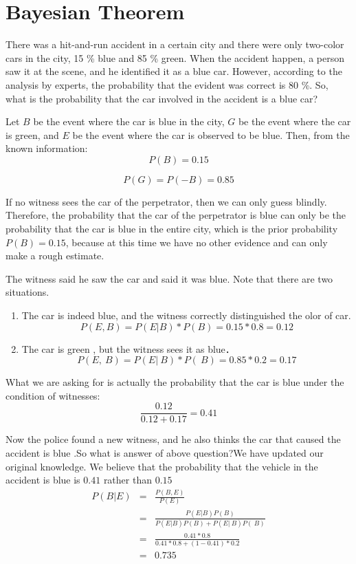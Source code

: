 \section{Bayesian Theorem}\label{}

There was a hit-and-run accident in a certain city and there were only two-color cars in the city, 15 \% blue and 85 \% green. When the accident happen, a person saw it at the scene, and he identified it as a blue car. However, according to the  analysis by experts, the probability that  the evident was correct is 80 \%. So, what is the probability that the car involved in the accident is a blue car?


Let $B$ be the event where the car is blue in the city, $G$ be the event where the car is green, and $E$ be the event where the car is observed to be blue. Then, from the known information:
$$P(B)=0.15$$

$$P(G)=P(-B)=0.85$$


If no witness sees the car of the perpetrator, then we can only guess blindly. Therefore, the probability that the car of the perpetrator is blue can only be the probability that the car is blue in the entire city, which is the prior probability $P(B)= 0.15$, because at this time we have no other evidence  and can only make a rough estimate.


The witness said he saw the car and said it was blue. Note that there are two situations.

\begin{enumerate}
  \item
The car is indeed blue, and the witness correctly distinguished the olor of car.
$$P(E,B) = P(E|B) * P(B) = 0.15 * 0.8 = 0.12$$
\item
The car is green , but the witness sees it as blue．
$$P(E,~B) = P(E|~B) * P(~B) = 0.85 * 0.2 = 0.17$$
\end{enumerate}


What we are asking for is actually the probability that the car is blue under the condition of witnesses:
$$
\frac{0.12}{0.12+0.17} = 0.41
$$


Now the police found a new witness, and he also thinks the car that caused the accident is blue
.So what is answer of above question?We have updated our original knowledge. We believe that the probability that the vehicle in the accident is blue is  $0.41$ rather than  $0.15$
\begin{eqnarray*}
P(B|E) &=& 　\frac{P(B,E)}{P(E)} \\
& = &  \frac{P(E|B)P(B)}{P(E|B)P(B)+P(E|~B)P(~B)} \\
& = &  \frac{0.41 * 0.8}{ 0.41 *0.8 + (1-0.41)*0.2} \\
& = &  0.735 \\
\end{eqnarray*}

